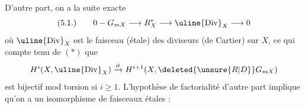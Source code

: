 D'autre part,  on a la suite exacte
\[
(5.1.)\qquad 0-G_{mX}\longrightarrow R_X^*\longrightarrow\uline{\mathrm{Div}}_X\longrightarrow0
\]
où $\uline{\mathrm{Div}}_X$ est le faisceau  (étale) des diviseurs (de Cartier) sur $X$, ce qui   compte tenu de $(*)$ que
\[
H^{i}(X,\uline{\mathrm{Div}}_X)\xrightarrow{\partial}H^{i+1}(X,\deleted{\unsure{R|D}}G_{mX})
\]
est bijectif mod torsion  si $i\geq1$.  L'hypothèse de factorialité d'autre part implique  qu'on a un isomorphisme de faisceaux étales :
